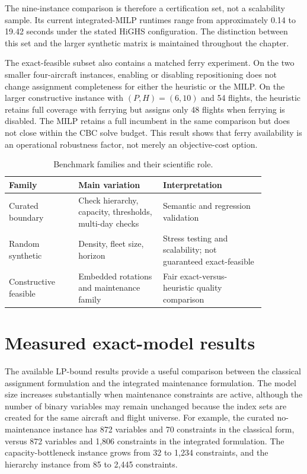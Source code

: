 The nine-instance comparison is therefore a certification set, not a
scalability sample. Its current integrated-MILP runtimes range from
approximately 0.14 to 19.42 seconds under the stated HiGHS configuration. The
distinction between this set and the larger synthetic matrix is maintained
throughout the chapter.

The exact-feasible subset also contains a matched ferry experiment. On the two
smaller four-aircraft instances, enabling or disabling repositioning does not
change assignment completeness for either the heuristic or the MILP. On the
larger constructive instance with $(P,H)=(6,10)$ and 54 flights, the heuristic
retains full coverage with ferrying but assigns only 48 flights when ferrying is
disabled. The MILP retains a full incumbent in the same comparison but does not
close within the CBC solve budget. This result shows that ferry availability is
an operational robustness factor, not merely an objective-cost option.

\begin{table}[t]
\centering\small
\caption{Benchmark families and their scientific role.}
\label{tab:benchmark_families}
\begin{tabular}{p{0.23\linewidth}p{0.29\linewidth}p{0.34\linewidth}}
\toprule
Family & Main variation & Interpretation \\
\midrule
Curated boundary & Check hierarchy, capacity, thresholds, multi-day checks & Semantic and regression validation \\
Random synthetic & Density, fleet size, horizon & Stress testing and scalability; not guaranteed exact-feasible \\
Constructive feasible & Embedded rotations and maintenance family & Fair exact-versus-heuristic quality comparison \\
\bottomrule
\end{tabular}
\end{table}

\section{Measured exact-model results}
\label{sec:computational_milp}

The available LP-bound results provide a useful comparison between the
classical assignment formulation and the integrated maintenance formulation.
The model size increases substantially when maintenance constraints are active,
although the number of binary variables may remain unchanged because the index
sets are created for the same aircraft and flight universe. For example, the
curated no-maintenance instance has 872 variables and 70 constraints in the
classical form, versus 872 variables and 1,806 constraints in the integrated
formulation. The capacity-bottleneck instance grows from 32 to 1,234
constraints, and the hierarchy instance from 85 to 2,445 constraints.

